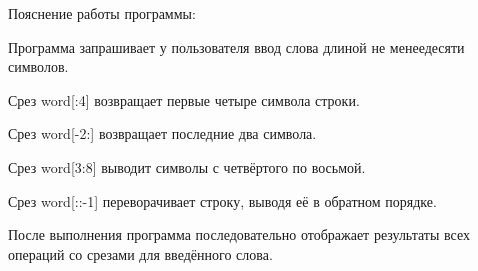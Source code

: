 \documentclass[]{vvsu}
\begin{document}
Пояснение работы программы:
\begin{vvsu_list}
  \item Программа запрашивает у пользователя ввод слова длиной не менее\linebreak десяти символов.
  \item Срез word[:4] возвращает первые четыре символа строки.
  \item Срез word[-2:] возвращает последние два символа.
  \item Срез word[3:8] выводит символы с четвёртого по восьмой.
  \item Срез word[::-1] переворачивает строку, выводя её в обратном порядке.
\end{vvsu_list}

После выполнения программа последовательно отображает результаты всех операций со срезами для введённого слова.


\end{document}
